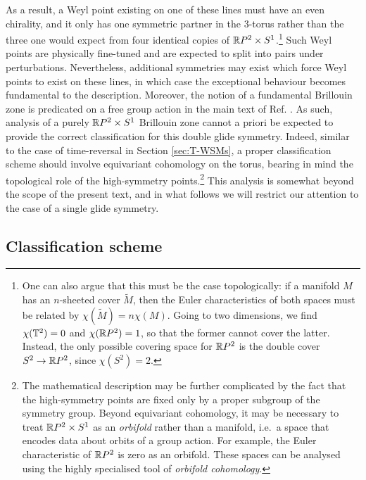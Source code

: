 As a result, a Weyl point existing on one of these lines must have an even chirality, and it only has one symmetric partner in the 3-torus rather than the three one would expect from four identical copies of $\mathbb{R} P^2\times S^1$.\footnote{
	One can also argue that this must be the case topologically: if a manifold $M$ has an $n$-sheeted cover $\tilde{M}$, then the Euler characteristics of both spaces must be related by $\chi(\tilde{M}) = n\chi(M)$. Going to two dimensions, we find $\chi(\mathbb{T}^2) = 0$ and $\chi(\mathbb{R} P^2) = 1$, so that the former cannot cover the latter. Instead, the only possible covering space for $\mathbb{R} P^2$ is the double cover $S^2\to\mathbb{R} P^2$, since $\chi(S^2) = 2$.}
Such Weyl points are physically fine-tuned and are expected to split into pairs under perturbations. Nevertheless, additional symmetries may exist which force Weyl points to exist on these lines, in which case the exceptional behaviour becomes fundamental to the description. %
Moreover, the notion of a fundamental Brillouin zone is predicated on a free group action in the main text of Ref. \cite{Fonseca-Vaidya_nonorientable}. As such, analysis of a purely $\mathbb{R} P^2\times S^1$ Brillouin zone cannot a priori be expected to provide the correct classification for this double glide symmetry. Indeed, similar to the case of time-reversal in Section \ref{sec:T-WSMs}, a proper classification scheme should involve equivariant cohomology on the torus, bearing in mind the topological role of the high-symmetry points.\footnote{
	The mathematical description may be further complicated by the fact that the high-symmetry points are fixed only by a proper subgroup of the symmetry group. Beyond equivariant cohomology, it may be necessary to treat $\mathbb{R} P^2\times S^1$ as an \emph{orbifold} rather than a manifold, i.e.\ a space that encodes data about orbits of a group action. For example, the Euler characteristic of $\mathbb{R} P^2$ is zero as an orbifold. These spaces can be analysed using the highly specialised tool of \emph{orbifold cohomology}. } %
This analysis is somewhat beyond the scope of the present text, and in what follows we will restrict our attention to the case of a single glide symmetry.

\subsection{Classification scheme}

